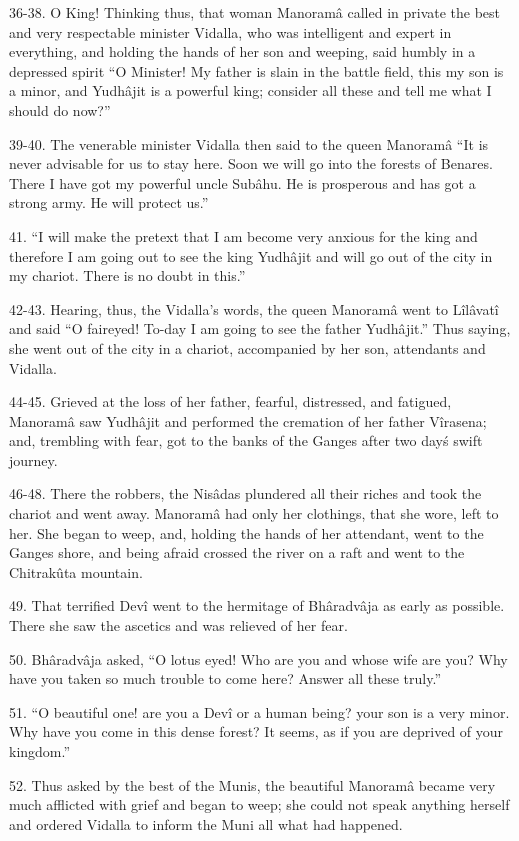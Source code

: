 36-38. O King! Thinking thus, that woman Manoram\^a called in private the best and very respectable minister Vidalla, who was intelligent and expert in everything, and holding the hands of her son and weeping, said humbly in a depressed spirit ``O Minister! My father is slain in the battle field, this my son is a minor, and Yudh\^ajit is a powerful king; consider all these and tell me what I should do now?''

39-40. The venerable minister Vidalla then said to the queen Manoram\^a ``It is never advisable for us to stay here. Soon we will go into the forests of Benares. There I have got my powerful uncle Sub\^ahu. He is prosperous and has got a strong army. He will protect us.''

41. ``I will make the pretext that I am become very anxious for the king and therefore I am going out to see the king Yudh\^ajit and will go out of the city in my chariot. There is no doubt in this.''

42-43. Hearing, thus, the Vidalla's words, the queen Manoram\^a went to L\^il\^avat\^i and said ``O faireyed! To-day I am going to see the father Yudh\^ajit.'' Thus saying, she went out of the city in a chariot, accompanied by her son, attendants and Vidalla.

44-45. Grieved at the loss of her father, fearful, distressed, and fatigued, Manoram\^a saw Yudh\^ajit and performed the cremation of her father V\^irasena; and, trembling with fear, got to the banks of the Ganges after two day\'s swift journey.

46-48. There the robbers, the Nis\^adas plundered all their riches and took the chariot and went away. Manoram\^a had only her clothings, that she wore, left to her. She began to weep, and, holding the hands of her attendant, went to the Ganges shore, and being afraid crossed the river on a raft and went to the Chitrakûta mountain.

49. That terrified Dev\^i went to the hermitage of Bh\^aradv\^aja as early as possible. There she saw the ascetics and was relieved of her fear.

50. Bh\^aradv\^aja asked, ``O lotus eyed! Who are you and whose wife are you? Why have you taken so much trouble to come here? Answer all these truly.''

51. ``O beautiful one! are you a Dev\^i or a human being? your son is a very minor. Why have you come in this dense forest? It seems, as if you are deprived of your kingdom.''

52. Thus asked by the best of the Munis, the beautiful Manoram\^a became very much afflicted with grief and began to weep; she could not speak anything herself and ordered Vidalla to inform the Muni all what had happened.

